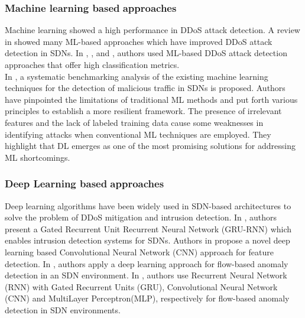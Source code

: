 \subsubsection{Machine learning based\textcolor{white}{.}approaches}
Machine learning showed a high performance in DDoS attack detection. A review in \cite{ml1} showed many ML-based approaches which have improved DDoS attack detection in SDNs. 
In \cite{ml2}, \cite{ml3}, \cite{ml4} and \cite{ml5}, authors used ML-based DDoS attack detection approaches that offer high classification metrics.\\
In \cite{ml6}, a systematic benchmarking analysis of the existing machine learning techniques for the detection of malicious traffic in SDNs is proposed. Authors have pinpointed the limitations of traditional ML methods and put forth various principles to establish a more resilient framework. The presence of irrelevant features and the lack of labeled training data cause some weaknesses in identifying attacks when conventional ML techniques are employed. They highlight that DL emerges as one of the most promising solutions for addressing ML shortcomings.


\subsubsection{Deep Learning based\textcolor{white}{.}approaches}
Deep learning algorithms have been widely used in SDN-based architectures to solve the problem of DDoS mitigation and intrusion detection. In \cite{dl1}, authors present a Gated Recurrent Unit Recurrent Neural Network (GRU-RNN) which enables intrusion detection systems for SDNs. Authors in \cite{dl2} propose a novel deep learning based Convolutional Neural Network (CNN) approach for feature detection. In \cite{dl3}, authors apply a deep learning approach for flow-based anomaly detection in an SDN environment. 
In \cite{dl4}, authors use Recurrent Neural Network (RNN) with Gated Recurrent Units (GRU), Convolutional Neural Network (CNN) and MultiLayer Perceptron(MLP), respectively for flow-based anomaly detection in SDN environments.

